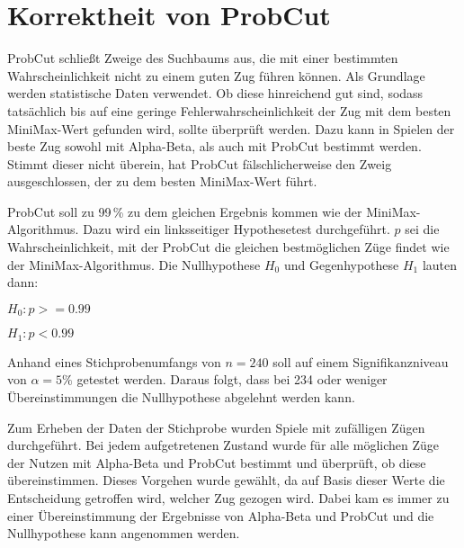 
\section{Korrektheit von ProbCut}
ProbCut schließt Zweige des Suchbaums aus, die mit einer bestimmten Wahrscheinlichkeit nicht zu einem guten Zug führen
können. Als Grundlage werden statistische Daten verwendet. Ob diese hinreichend gut sind, sodass tatsächlich bis auf
eine geringe Fehlerwahrscheinlichkeit der Zug mit dem besten MiniMax-Wert gefunden wird, sollte überprüft werden. Dazu
kann in Spielen der beste Zug sowohl mit Alpha-Beta, als auch mit ProbCut bestimmt werden. Stimmt dieser nicht überein,
hat ProbCut fälschlicherweise den Zweig ausgeschlossen, der zu dem besten MiniMax-Wert führt.

ProbCut soll zu 99\,\% zu dem gleichen Ergebnis kommen wie der MiniMax-Algorithmus. Dazu wird ein linksseitiger
Hypothesetest durchgeführt. $p$ sei die Wahrscheinlichkeit, mit der ProbCut die gleichen bestmöglichen Züge findet wie
der MiniMax-Algorithmus. Die Nullhypothese $H_0$ und Gegenhypothese $H_1$ lauten dann:

\hspace*{1.3cm}
$H_0:p>=0.99$

\hspace*{1.3cm}
$H_1:p<0.99$

Anhand eines Stichprobenumfangs von $n=240$ soll auf einem Signifikanzniveau von $\alpha=5\%$ getestet werden. Daraus
folgt, dass bei 234 oder weniger Übereinstimmungen die Nullhypothese abgelehnt werden kann.

Zum Erheben der Daten der Stichprobe wurden Spiele mit zufälligen Zügen durchgeführt. Bei jedem aufgetretenen Zustand
wurde für alle möglichen Züge der Nutzen mit Alpha-Beta und ProbCut bestimmt und überprüft, ob diese übereinstimmen.
Dieses Vorgehen wurde gewählt, da auf Basis dieser Werte die Entscheidung getroffen wird, welcher Zug gezogen wird.
Dabei kam es immer zu einer Übereinstimmung der Ergebnisse von Alpha-Beta und ProbCut und die Nullhypothese kann
angenommen werden.
